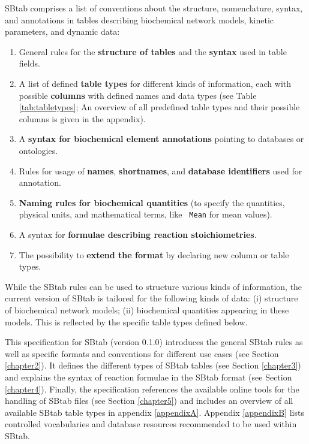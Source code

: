 \documentclass[a4paper]{article}
\newcommand{\la}[1]{}
\newcommand{\defint}[1] {\texttt{\color{darkgreen} #1}}
\begin{document}
SBtab comprises a list of conventions about the structure,
nomenclature, syntax, and annotations in tables describing biochemical
network models, kinetic parameters, and dynamic data:
\begin{enumerate}
\item General rules for the \textbf{structure of tables} and the \textbf{syntax} used in  table fields.
\item A list of defined \textbf{table types} for different kinds of
  information, each with possible \textbf{columns} with defined names
  and data types (see Table \ref{tab:tabletypes}; An overview of all
  predefined table types and their possible columns is given in the
  appendix).
\item A \textbf{syntax for biochemical element annotations} pointing to  databases
  or ontologies.
\item Rules for usage of \textbf{names}, \textbf{shortnames}, and \textbf{database identifiers}
  used for annotation.
\item \textbf{Naming rules for biochemical  quantities} (to specify the  quantities,
  physical units, and mathematical terms, like \defint{Mean} for mean values).
\item A syntax for \textbf{formulae describing reaction stoichiometries}. \la{simple kinetics, and regulation.}
\item The possibility to \textbf{extend the format} by declaring new column or table types.  
\end{enumerate}
While the SBtab rules can be used to structure various kinds of
information, the current version of SBtab is tailored for the
following kinds of data: (i) structure of biochemical network models;
(ii) biochemical quantities appearing in these models. \la{; (iii) omics
data.} This is reflected by the specific table types defined below.


This specification for SBtab (version 0.1.0) introduces the general SBtab rules as well as
specific formats and conventions for different use cases (see Section
\ref{chapter2}).  It defines the different types of SBtab tables (see
Section \ref{chapter3}) and explains the syntax of reaction \la{and
regulation} formulae in the SBtab format (see Section \ref{chapter4}).
Finally, the specification references the available online tools for
the handling of SBtab files (see Section \ref{chapter5}) and includes
an overview of all available SBtab table types in appendix
\ref{appendixA}. Appendix \ref{appendixB} lists controlled
vocabularies and database resources recommended to be used within
SBtab.
\end{document}
